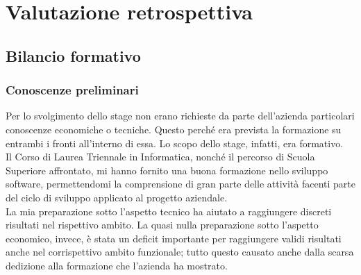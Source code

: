 
\chapter{Valutazione retrospettiva}

\section{Bilancio formativo}


\subsection{Conoscenze preliminari}


Per lo svolgimento dello stage non erano richieste da parte dell'azienda particolari conoscenze economiche o tecniche. Questo perché era prevista la formazione su entrambi i fronti all'interno di essa. Lo scopo dello stage, infatti, era formativo.\\

Il Corso di Laurea Triennale in Informatica, nonché il percorso di Scuola Superiore affrontato, mi hanno fornito una buona formazione nello sviluppo software, permettendomi la comprensione di gran parte delle attività facenti parte del ciclo di sviluppo applicato al progetto aziendale.\\

La mia preparazione sotto l'aspetto tecnico ha aiutato a raggiungere discreti risultati nel rispettivo ambito. La quasi nulla preparazione sotto l'aspetto economico, invece, è stata un deficit importante per raggiungere validi risultati anche nel corrispettivo ambito funzionale; tutto questo causato anche dalla scarsa dedizione alla formazione che l'azienda ha mostrato.\\

